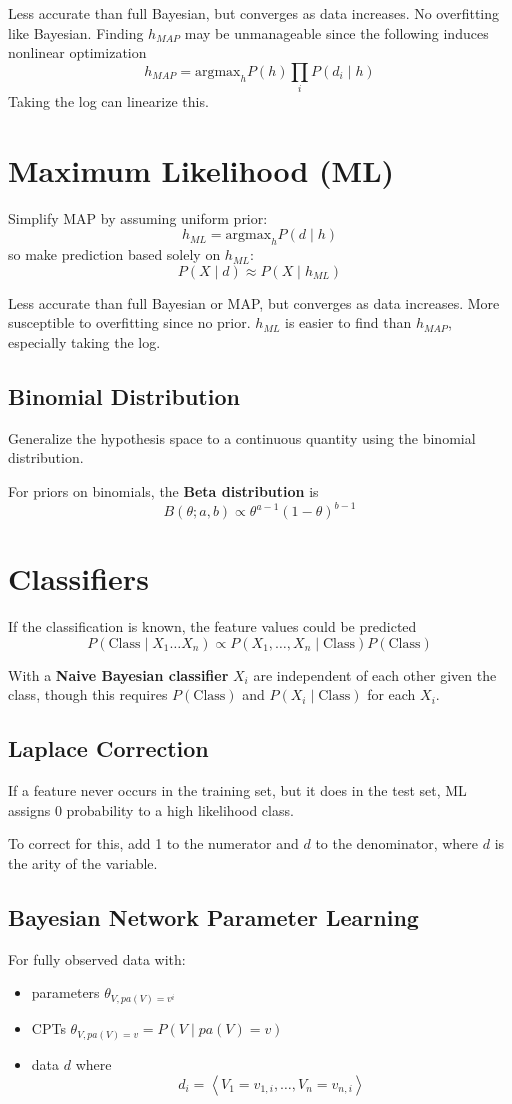 \documentclass[11pt]{article}
\begin{document}
Less accurate than full Bayesian, but converges as data increases.
No overfitting like Bayesian.
Finding \(h_{MAP}\) may be unmanageable since the following induces nonlinear
optimization
$$ h_{MAP} = \text{argmax}_{h} P(h) \prod_{i} P(d_{i} \mid h) $$
Taking the log can linearize this.
\section{Maximum Likelihood (ML)}
\label{sec:org23a9f1a}
Simplify MAP by assuming uniform prior:
$$ h_{ML} = \text{argmax}_{h} P(d \mid h) $$
so make prediction based solely on \(h_{ML}\):
$$ P(X \mid d) \approx P(X \mid h_{ML}) $$

Less accurate than full Bayesian or MAP, but converges as data increases.
More susceptible to overfitting since no prior.
\(h_{ML}\) is easier to find than \(h_{MAP}\), especially taking the log.
\subsection{Binomial Distribution}
\label{sec:org6be4428}
Generalize the hypothesis space to a continuous quantity using the
binomial distribution.

For priors on binomials, the \textbf{Beta distribution} is
$$ B(\theta ; a, b) \propto \theta^{a-1}(1-\theta)^{b-1} $$
\section{Classifiers}
\label{sec:org70bd048}
If the classification is known, the feature values could be predicted
$$ P(\text{Class} \mid X_{1} \dots X_{n}) \propto P(X_{1}, \dots, X_{n} \mid \text{Class}) P(\text{Class}) $$

With a \textbf{Naive Bayesian classifier} \(X_{i}\) are independent of each other given the class,
though this requires \(P(\text{Class})\) and \(P(X_{i} \mid \text{Class})\) for each \(X_{i}\).
\subsection{Laplace Correction}
\label{sec:org3aed38e}
If a feature never occurs in the training set, but it does in the test set, ML
assigns 0 probability to a high likelihood class.

To correct for this, add 1 to the numerator and \(d\) to the denominator, where \(d\)
is the arity of the variable.
\subsection{Bayesian Network Parameter Learning}
\label{sec:orgf94c92e}
For fully observed data with:
\begin{itemize}
\item parameters \(\theta_{V, pa(V) = v^{i}}\)
\item CPTs \(\theta_{V, pa(V) = v} = P(V \mid pa(V) = v)\)
\item data \(d\) where
$$ d_{i} = \left< V_{1} = v_{1, i}, \dots, V_{n} = v_{n, i} \right> $$
\end{itemize}
\end{document}

